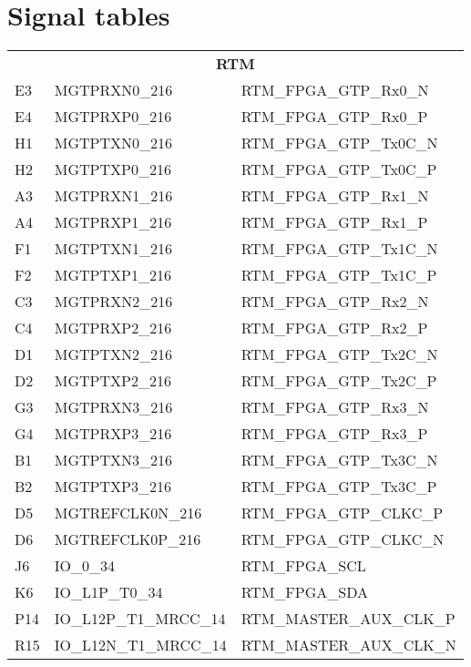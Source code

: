 \section{Signal tables}
\begin{footnotesize}
	\begin{longtable}{|l|p{6cm}|p{6cm}|}
	\hline
	\multicolumn{3}{|c|}{\multirow{2}{*}{\textbf{\large{RTM}}}}\\
	\multicolumn{3}{|c|}{} \\ \hline 
	E3	&	MGTPRXN0\_216	&	RTM\_FPGA\_GTP\_Rx0\_N	\\ \hline
	E4	&	MGTPRXP0\_216	&	RTM\_FPGA\_GTP\_Rx0\_P	\\ \hline
	H1	&	MGTPTXN0\_216	&	RTM\_FPGA\_GTP\_Tx0C\_N	\\ \hline
	H2	&	MGTPTXP0\_216	&	RTM\_FPGA\_GTP\_Tx0C\_P	\\ \hline
	A3	&	MGTPRXN1\_216	&	RTM\_FPGA\_GTP\_Rx1\_N	\\ \hline
	A4	&	MGTPRXP1\_216	&	RTM\_FPGA\_GTP\_Rx1\_P	\\ \hline
	F1	&	MGTPTXN1\_216	&	RTM\_FPGA\_GTP\_Tx1C\_N	\\ \hline
	F2	&	MGTPTXP1\_216	&	RTM\_FPGA\_GTP\_Tx1C\_P	\\ \hline
	C3	&	MGTPRXN2\_216	&	RTM\_FPGA\_GTP\_Rx2\_N	\\ \hline
	C4	&	MGTPRXP2\_216	&	RTM\_FPGA\_GTP\_Rx2\_P	\\ \hline
	D1	&	MGTPTXN2\_216	&	RTM\_FPGA\_GTP\_Tx2C\_N	\\ \hline
	D2	&	MGTPTXP2\_216	&	RTM\_FPGA\_GTP\_Tx2C\_P	\\ \hline
	G3	&	MGTPRXN3\_216	&	RTM\_FPGA\_GTP\_Rx3\_N	\\ \hline
	G4	&	MGTPRXP3\_216	&	RTM\_FPGA\_GTP\_Rx3\_P	\\ \hline
	B1	&	MGTPTXN3\_216	&	RTM\_FPGA\_GTP\_Tx3C\_N	\\ \hline
	B2	&	MGTPTXP3\_216	&	RTM\_FPGA\_GTP\_Tx3C\_P	\\ \hline
	D5	&	MGTREFCLK0N\_216	&	RTM\_FPGA\_GTP\_CLKC\_P	\\ \hline
	D6	&	MGTREFCLK0P\_216	&	RTM\_FPGA\_GTP\_CLKC\_N	\\ \hline
	J6	&	IO\_0\_34	&	RTM\_FPGA\_SCL	\\ \hline
	K6	&	IO\_L1P\_T0\_34	&	RTM\_FPGA\_SDA	\\ \hline
	P14	&	IO\_L12P\_T1\_MRCC\_14	&	RTM\_MASTER\_AUX\_CLK\_P	\\ \hline
	R15	&	IO\_L12N\_T1\_MRCC\_14	&	RTM\_MASTER\_AUX\_CLK\_N	\\ \hline

\end{longtable}
\end{footnotesize}
